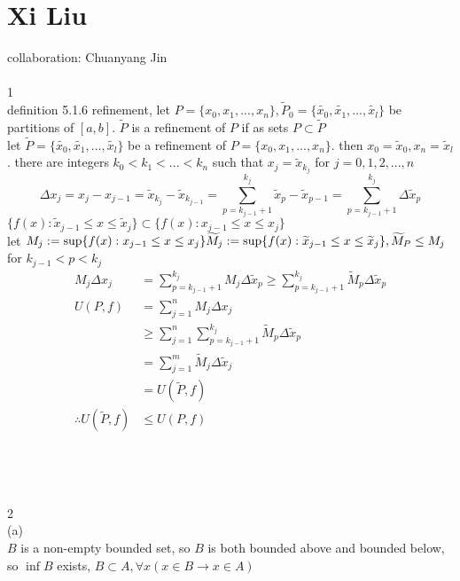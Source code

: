 \documentclass[12pt, border = 4pt, multi]{article} %
\begin{document}
\section*{Xi Liu}
collaboration: Chuanyang Jin\\
\\
1\\
definition 5.1.6 refinement, let $P = \{x_0, x_1, ..., x_n\}, \widetilde{P}_0 = \{\widetilde{x_0}, \widetilde{x_1}, ..., \widetilde{x_l}\}$ be partitions of $[a, b]$. $\widetilde{P}$ is a refinement of $P$ if as sets $P \subset \widetilde{P}$\\
let $\widetilde{P} = \{\widetilde{x_0}, \widetilde{x_1}, ..., \widetilde{x_l}\}$ be a refinement of $P = \{x_0, x_1, ..., x_n\}$. then $x_0 = \widetilde{x}_0, x_n = \widetilde{x}_l$. there are integers $k_0 < k_1 < ... < k_n$ such that $x_j = \widetilde{x}_{k_j}$ for $j = 0, 1, 2, ..., n$
\[\Delta x_j = x_j - x_{j - 1} = \widetilde{x}_{k_j} - \widetilde{x}_{k_{j - 1}} = \sum_{p = k_{j - 1} + 1} ^ {k_j} \widetilde{x}_p - \widetilde{x}_{p - 1} = \sum_{p = k_{j - 1} + 1} ^ {k_j} \Delta\widetilde{x}_p\]
$\{f(x): \widetilde{x}_{j - 1} \leq x \leq \widetilde{x}_j\} \subset \{f(x): x_{j - 1} \leq x \leq x_j\}$\\
let $M_j := \sup\{f(x): x_{j - 1} \leq x \leq x_j\}\\
\widetilde{M}_j := \sup\{f(x): \widetilde{x}_{j - 1} \leq x \leq \widetilde{x}_j\}, \widetilde{M}_P \leq M_j$ for $k_{j - 1} < p < k_j$
\begin{align*}
M_j \Delta x_j &= \sum_{p = k_{j - 1} + 1} ^ {k_j} M_j \Delta \widetilde{x}_p \geq \sum_{p = k_{j - 1} + 1} ^ {k_j} \widetilde{M}_p \Delta \widetilde{x}_p\\
U(P, f) &= \sum_{j = 1} ^ n M_j \Delta x_j\\
&\geq \sum_{j = 1} ^ n \sum_{p = k_{j - 1} + 1} ^ {k_j} \widetilde{M}_p \Delta \widetilde{x}_p\\
&= \sum_{j = 1} ^ m \widetilde{M}_j \Delta \widetilde{x}_j\\
&= U(\widetilde{P}, f)\\
\therefore U(\widetilde{P}, f) &\leq U(P, f)
\end{align*}
\\
\\
\\
\\
2\\
(a)\\
$B$ is a non-empty bounded set, so $B$ is both bounded above and bounded below, so $\inf B$ exists, $B \subset A, \forall x(x \in B \rightarrow x \in A)$\\
\end{document}
